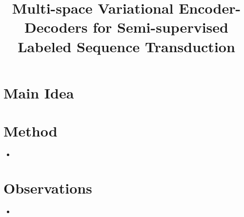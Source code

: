 \documentclass[12pt]{scrartcl}
\begin{document}
\title{Multi-space Variational Encoder-Decoders for Semi-supervised Labeled Sequence Transduction}
\author{}
\date{}
\maketitle

\section{Main Idea}
  \cite{zhou2017multi}

\section{Method}
  \begin{itemize}
    \item 
  \end{itemize}

\section{Observations}
  \begin{itemize}
    \item 
  \end{itemize}



\end{document}
